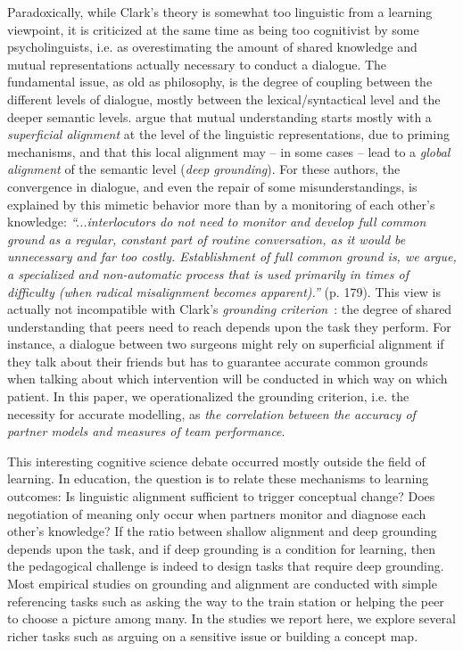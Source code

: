 \documentclass[natbib]{svjour3}
\newcommand{\ie}{i.e.\xspace}
\begin{document}
Paradoxically, while Clark's theory is somewhat too linguistic from a learning
viewpoint, it is criticized at the same time as being too cognitivist by some
psycholinguists, \ie as overestimating the amount of shared knowledge and mutual
representations actually necessary to conduct a dialogue. The fundamental issue,
as old as philosophy, is the degree of coupling between the different levels of
dialogue, mostly between the lexical/syntactical level and the deeper semantic
levels. \citet{pickering2006alignment} argue that mutual understanding
starts mostly with a \emph{superficial alignment} at the level of the linguistic
representations, due to priming mechanisms, and that this local alignment may --
in some cases -- lead to a \emph{global alignment} of the semantic level
(\emph{deep grounding}).  For these authors, the convergence in dialogue, and
even the repair of some misunderstandings, is explained by this mimetic behavior
more than by a monitoring of each other's knowledge: \emph{``...interlocutors do
not need to monitor and develop full common ground as a regular, constant
part of routine conversation, as it would be unnecessary and far too costly.
Establishment of full common ground is, we argue, a specialized and
non-automatic process that is used primarily in times of difficulty (when
radical misalignment becomes apparent).''} (p. 179).  This view is actually not
incompatible with Clark's \emph{grounding
criterion}~\citep{clark1989contributing}: the degree of shared understanding
that peers need to reach depends upon the task they perform. For instance, a
dialogue between two surgeons might rely on superficial alignment if they talk
about their friends but has to guarantee accurate common grounds when talking
about which intervention will be conducted in which way on which patient.  In
this paper, we operationalized the grounding criterion, \ie the necessity for
accurate modelling, as \emph{the correlation between the accuracy of partner models
and measures of team performance}.


This interesting cognitive science debate occurred mostly outside the field of
learning. In education, the question is to relate these mechanisms to learning
outcomes: Is linguistic alignment sufficient to trigger conceptual
change? Does negotiation of meaning only occur when partners monitor
and diagnose each other's knowledge? If the ratio between shallow alignment and
deep grounding depends upon the task, and if deep grounding is a condition for
learning, then the pedagogical challenge is indeed to design tasks that require
deep grounding. Most empirical studies on grounding and alignment are conducted
with simple referencing tasks such as asking the way to the train station
or helping the peer to choose a picture among many. In the studies we report here, we
explore several richer tasks such as arguing on a sensitive issue or building a
concept map.  
\end{document}
